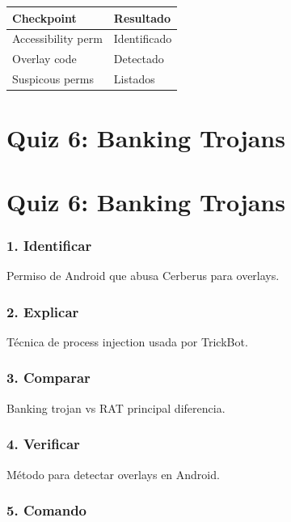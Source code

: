 \documentclass[
  letterpaper,
]{report}
\newcounter{none} %
\begin{document}
{\def\LTcaptype{none} %
\begin{longtable}[]{@{}ll@{}}
\toprule\noalign{}
Checkpoint & Resultado \\
\midrule\noalign{}
\endhead
\bottomrule\noalign{}
\endlastfoot
Accessibility perm & Identificado \\
Overlay code & Detectado \\
Suspicous perms & Listados \\
\end{longtable}
}

\chapter{Quiz 6: Banking Trojans}\label{quiz-6-banking-trojans}

\chapter{Quiz 6: Banking Trojans}\label{quiz-6-banking-trojans-1}

\subsection{1. Identificar}\label{identificar-1}

Permiso de Android que abusa Cerberus para overlays.

\subsection{2. Explicar}\label{explicar-1}

Técnica de process injection usada por TrickBot.

\subsection{3. Comparar}\label{comparar}

Banking trojan vs RAT principal diferencia.

\subsection{4. Verificar}\label{verificar}

Método para detectar overlays en Android.

\subsection{5. Comando}\label{comando-4}
\end{document}
